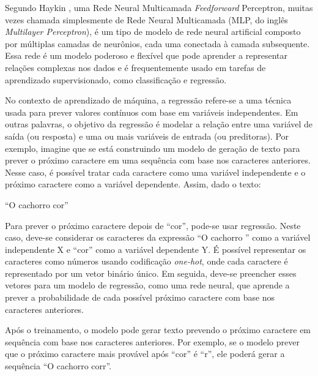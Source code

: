 \documentclass[10pt, conference, compsocconf]{IEEEtran}
\begin{document}
\FloatBarrier

Segundo Haykin \cite{haykin2001redes}, uma Rede Neural Multicamada \textit{Feedforward} Perceptron, muitas vezes chamada simplesmente de Rede Neural Multicamada (MLP, do inglês \textit{Multilayer Perceptron}), é um tipo de modelo de rede neural artificial composto por múltiplas camadas de neurônios, cada uma conectada à camada subsequente. Essa rede é um modelo poderoso e flexível que pode aprender a representar relações complexas nos dados e é frequentemente usado em tarefas de aprendizado supervisionado, como classificação e regressão.

No contexto de aprendizado de máquina, a regressão refere-se a uma técnica usada para prever valores contínuos com base em variáveis independentes. Em outras palavras, o objetivo da regressão é modelar a relação entre uma variável de saída (ou resposta) e uma ou mais variáveis de entrada (ou preditoras). Por exemplo, imagine que se está construindo um modelo de geração de texto para prever o próximo caractere em uma sequência com base nos caracteres anteriores. Nesse caso, é possível tratar cada caractere como uma variável independente e o próximo caractere como a variável dependente. Assim, dado o texto:

``O cachorro cor''

Para prever o próximo caractere depois de ``cor'', pode-se usar regressão. Neste caso, deve-se considerar os caracteres da expressão ``O cachorro '' como a variável independente X e ``cor'' como a variável dependente Y. É possível representar os caracteres como números usando codificação \textit{one-hot}, onde cada caractere é representado por um vetor binário único. Em seguida, deve-se preencher esses vetores para um modelo de regressão, como uma rede neural, que aprende a prever a probabilidade de cada possível próximo caractere com base nos caracteres anteriores.

Após o treinamento, o modelo pode gerar texto prevendo o próximo caractere em sequência com base nos caracteres anteriores. Por exemplo, se o modelo prever que o próximo caractere mais provável após ``cor'' é ``r'', ele poderá gerar a sequência ``O cachorro corr''. 



\end{document}

